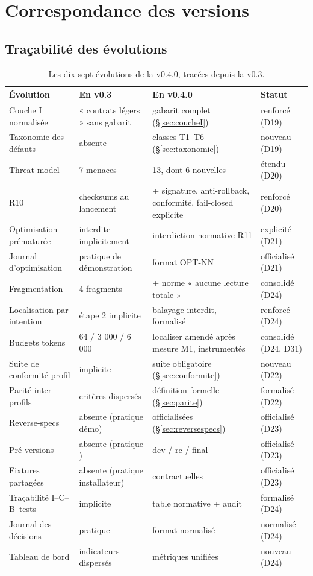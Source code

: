 \section{Correspondance des versions}\label{sec:correspondance}

\subsection{Traçabilité des évolutions}\label{sec:evolutions}

\begin{table}[htbp]
\centering\small
\caption{Les dix-sept évolutions de la v0.4.0, tracées depuis la v0.3.}
\label{tab:correspondance}
\begin{tabularx}{\textwidth}{@{}l Y Y l@{}}
\toprule
\textbf{Évolution} & \textbf{En v0.3} & \textbf{En v0.4.0} & \textbf{Statut} \\
\midrule
Couche I normalisée & « contrats légers » sans gabarit & gabarit complet
(§\ref{sec:coucheI}) & renforcé (D19) \\
Taxonomie des défauts & absente & classes T1–T6 (§\ref{sec:taxonomie}) & nouveau (D19) \\
Threat model & 7 menaces & 13, dont 6 nouvelles & étendu (D20) \\
R10 & checksums au lancement & + signature, anti-rollback, conformité, fail-closed
explicite & renforcé (D20) \\
Optimisation prématurée & interdite implicitement & interdiction normative R11 &
explicité (D21) \\
Journal d'optimisation & pratique de démonstration & format OPT-NN & officialisé (D21) \\
Fragmentation & 4 fragments & + norme « aucune lecture totale » & consolidé (D24) \\
Localisation par intention & étape 2 implicite & balayage interdit, formalisé &
renforcé (D24) \\
Budgets tokens & 64 / 3 000 / 6 000 & localiser amendé après mesure M1, instrumentés & consolidé (D24, D31) \\
Suite de conformité profil & implicite & suite obligatoire (§\ref{sec:conformite}) &
nouveau (D22) \\
Parité inter-profils & critères dispersés & définition formelle (§\ref{sec:parite}) &
formalisé (D22) \\
Reverse-specs & absente (pratique démo) & officialisées (§\ref{sec:reversespecs}) &
officialisé (D23) \\
Pré-versions & absente (pratique ) & dev / rc / final & officialisé (D23) \\
Fixtures partagées & absente (pratique installateur) & contractuelles & officialisé
(D23) \\
Traçabilité I–C–B–tests & implicite & table normative + audit & formalisé (D24) \\
Journal des décisions & pratique & format normalisé & normalisé (D24) \\
Tableau de bord & indicateurs dispersés & métriques unifiées & nouveau (D24) \\
\bottomrule
\end{tabularx}
\end{table}

